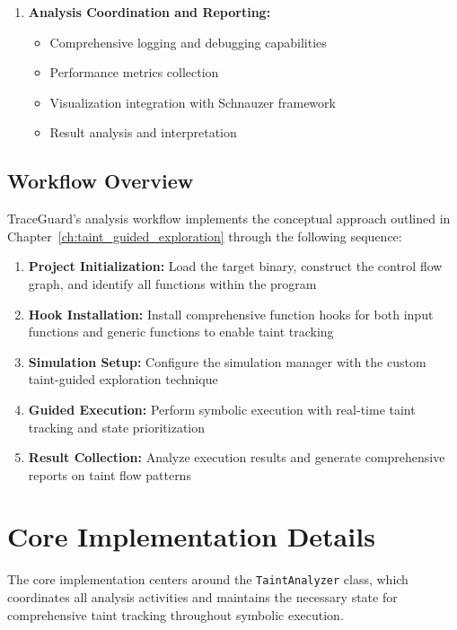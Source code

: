 \begin{enumerate}
    \item \textbf{Analysis Coordination and Reporting:}
    \begin{itemize}
        \item Comprehensive logging and debugging capabilities
        \item Performance metrics collection
        \item Visualization integration with Schnauzer framework
        \item Result analysis and interpretation
    \end{itemize}
\end{enumerate}

\subsection{Workflow Overview}

TraceGuard's analysis workflow implements the conceptual approach outlined in Chapter~\ref{ch:taint_guided_exploration} through the following sequence:

\begin{enumerate}
    \item \textbf{Project Initialization:} Load the target binary, construct the control flow graph, and identify all functions within the program
    \item \textbf{Hook Installation:} Install comprehensive function hooks for both input functions and generic functions to enable taint tracking
    \item \textbf{Simulation Setup:} Configure the simulation manager with the custom taint-guided exploration technique
    \item \textbf{Guided Execution:} Perform symbolic execution with real-time taint tracking and state prioritization
    \item \textbf{Result Collection:} Analyze execution results and generate comprehensive reports on taint flow patterns
\end{enumerate}

\section{Core Implementation Details}\label{sec:core_implementation}

The core implementation centers around the \texttt{TaintAnalyzer} class, which coordinates all analysis activities and maintains the necessary state for comprehensive taint tracking throughout symbolic execution.

